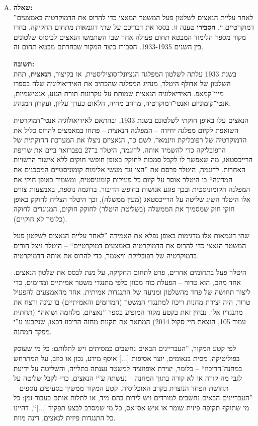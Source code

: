 \documentclass[a4paper]{article}
\newcommand\hl[1]   {#1}
\begin{document}
\begin{enumerate}[A.]
			\item \textbf{שאלה: }\\
			''לאחר עליית הנאצים לשלטון פעל המשטר המאצי כדי להרוס את הדמוקרטיה באמצעים דמוקרטיים.``. \textbf{הסבירו} טענה זו. בססו את דבריכם על שתי דוגמאות מתחום החקיקה. בחרו מקור מספר הלימוד המבטא תחום פעולה אחר שבו השתמשו הנאצים לביסוס שלטונים בין השנים 1933-1935. הסבירו כיצד המקור שבחרתם מבטא תחום זה. 
			
			\textbf{תשובה: }\\
			בשנת 1933 עלתה לשלטון המפלגה הנציונל־סוציליסטית, או בקיצור, \textbf{הנאצית}, תחת השלטון של \hl{אדולף היטלר}, מנהיג המפלגה שהכתיב את האידיאולוגיה שלה בספרו מיין־קמאפ. האידיאלוגיה הנאצית שמותת על עקרונות תורת הגזע, אנטישמיות, אנטי־קומוניזם ואנטי־דמוקרטיה, מרחב מחיה, הלאום כערך עליון, ועקרון המנהיג. 
			
			הנאצים עלו באופן חוקתי לשלטונם בשנת 1933, ובהתאם לאידיאולוגיה אנטי־דמוקרטית השואפת לקיום מפלגה יחידה – המפלגה הנאצית – פתחו במאמצים להרוס כליל את הדמוקרטיה של רפובליקת ווינמאר. לשם כך, הנאציזם ניצלו את המערכת החוקתית של הרפובליקה כדי להשמיד אותה. לדוגמה, היטלר ב־27 בפברואר ביים את שריפת הרייכסטאג, מה שאפשר לו לקבל סמכות לחוקק באופן חופשי חוקים ללא אישור הרשויות האחרות. לדוגמה, היטלר פרסם את ''הצו נגד מעשי אלימות קומוניסטיים המסכנים את המדינה`` בו היטלר אוסר על קיום כל פעילות קומוניסטית, ומשמיד באופן חוקי את המפלגה הקומוניסטית ובכך פוגע אנושות בחופש הדיבור. בדוגמה נוספת, באמצעות צווים אלו היטלר השיג שליטה על הרייכסטאג (מעין ממשלה), וכך היטלר הצליח לחוקק באופן חוקי חוק שמסמיך את הממשלה (בשליטת היטלר) לחוקק חוקים, המנוגדים לחוקה (כלומר לא חוקיים). 
			
			שתי דוגמאות אלו מדגימות באופן נפלא את האמירה ''לאחר עליית הנאצים לשלטון פעל המשטר הנאצי כדי להרוס את הדמוקרטיה באמצעים דמוקרטיים`` – היטלר ניצל חורים בדמוקרטיה של רפובליקת וויאנמר, כדי להרוס את אותה הדמוקרטיה. 
			
			היטלר פעל בתחומים אחרים, פרט לתחום החקיקה, על מנת לבסס את שלטון הנאצים. אחד מהם, הוא טרור – הפעלת כוח מכוון כלפי מתנגדי משטר אמיתיים ומדומים, כדי ליצור תחושה של פחד מהשלטון ומניעה של התנגדות אמיתית. אחד מהאמצעים להפעיל טרור, היה יצירת מחנות ריכוז למתנגדי המשטר (המדומים והאמיתיים) בו עינה ורצח את מתנגדיו אלו. נבחין זאת בקטע מקור המופיע בספר ''נאציזם, מלחמה ושואה`` (תחתית עמוד 105, הוצאת היי־סקול 2014) המתאר את תקנות מחזה הריכוז דכאו, שנקבעו ע''י מפקד המחנה.
			
			לפי קטע המקור, ''העבריינים הבאים נחשבים כמסיתים ויש לתלותם: כל מי שעוסק בפוליטיקה, מסית בנאומים, יוצר אסיפות [...] אוסף מידע, נכון או כוזב, על המתרחש במחנה־הריכוז`` – כלומר, יצירת אופוזציה למשטר נענתה בתלייה, והשליטה על ידיעת לגבי מה קורה או לא קורה בתוך המחנה – נעשתה ע''י הנאצים, כדי לקבל שליטה על תחושת הפחד הנוצרת בקרב האוכלוסיה. קטע המקור ממשיך בסעיפים נוספים – ''העבריינים הבאים נחשבים למורדים ויש לירות בהם מיד, או לתלות אותם כעבור זמן: כל מי שתוקף תקיפה פיזית שומר או איש אס־אס, כל מי שמסרב לבצע תפקיד [...]``, דהיינו כל התנגדות פיזית לנאצים, דינה מוות. 
			
		\end{enumerate}
		
\end{document}
